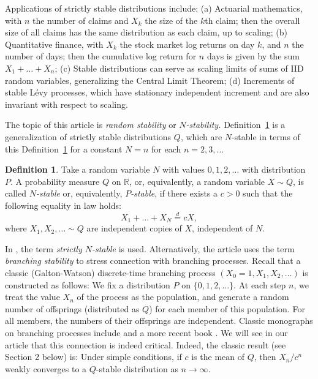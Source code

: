 \documentclass[12pt]{amsart}
\theoremstyle{remark}
\theoremstyle{definition}
\newtheorem{definition}{Definition}[section]
\begin{document}
Applications of strictly stable distributions include: (a) Actuarial mathematics, with $n$ the number of claims and $X_k$ the size of the $k$th claim; then the overall size of all claims has the same distribution as each claim, up to scaling; (b) Quantitative finance, with $X_k$ the stock market log returns on day $k$, and $n$ the number of days; then the cumulative log return for $n$ days is given by the sum $X_1 + \ldots + X_n$; (c) Stable distributions can serve as scaling limits of sums of IID random variables, generalizing the Central Limit Theorem; (d) Increments of stable L\'evy processes, which have stationary independent increment and are also invariant with respect to scaling. 

The topic of this article is {\it random stability} or {\it $N$-stability.} Definition~\ref{def:main-RV} is a generalization of strictly stable distributions $Q$, which are $N$-stable in terms of this Definition~\ref{def:main-RV} for a constant $N = n$ for each $n = 2, 3, \ldots$  

\begin{definition}
Take a random variable $N$ with values $0, 1, 2, \ldots$ with distribution $P$. A probability measure $Q$ on $\mathbb R$, or, equivalently, a random variable $X \sim Q$, is called {\it $N$-stable} or, equivalently, {\it $P$-stable}, if there exists a $c > 0$ such that the following equality in law holds: 
\begin{equation}
\label{eq:main-RV}
X_1 + \ldots + X_N \stackrel{d}{=} cX,
\end{equation}
where $X_1, X_2, \ldots \sim Q$ are independent copies of $X$, independent of $N$. 
\label{def:main-RV}
\end{definition}

In \cite[Definition 3]{Klebanov}, the term {\it strictly $N$-stable} is used. Alternatively, the article \cite{B} uses the term {\it branching stability} to stress connection with branching processes. Recall that a classic (Galton-Watson) discrete-time branching process $(X_0 = 1, X_1, X_2, \ldots)$ is constructed as follows: We fix a distribution $P$ on $\{0, 1, 2, \ldots\}$. At each step $n$, we treat the value $X_n$ of the process as the population, and generate a random number of offsprings (distributed as $Q$) for each member of this population. For all members, the numbers of their offsprings are independent. Classic monographs on branching processes include \cite{Harris} and a more recent book \cite{AthreyaBook}. We will see in our article that this connection is indeed critical. Indeed, the classic result (see Section 2 below) is: Under simple conditions, if $c$ is the mean of $Q$, then $X_n/c^n$ weakly converges to a $Q$-stable distribution as $n \to \infty$.  
\end{document}
